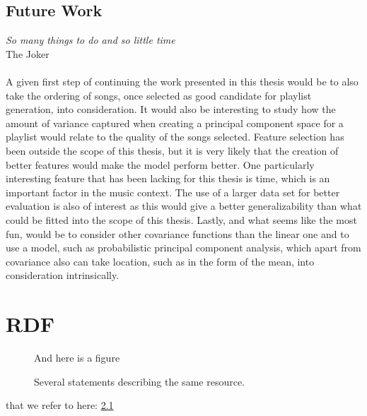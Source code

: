 \documentclass[a4paper,11pt]{kth-mag}
\begin{document}
\section{Future Work}
\textit{So many things to do and so little time} \\The Joker\\\\
A given first step of continuing the work presented in this thesis would be to also take the ordering of songs, once selected as good candidate for playlist generation, into consideration. It would also be interesting to study how the amount of variance captured when creating a principal component space for a playlist would relate to the quality of the songs selected. Feature selection has been outside the scope of this thesis, but it is very likely that the creation of better features would make the model perform better. One particularly interesting feature that has been lacking for this thesis is time, which is an important factor in the music context. The use of a larger data set for better evaluation is also of interest as this would give a better generalizability than what could be fitted into the scope of this thesis. Lastly, and what seems like the most fun, would be to consider other covariance functions than the linear one and to use a model, such as probabilistic principal component analysis, which apart from covariance also can take location, such as in the form of the mean, into consideration intrinsically.



\appendix
\addappheadtotoc
\chapter{RDF}\label{appA}

\begin{figure}[ht]
\begin{center}
And here is a figure
\caption{\small{Several statements describing the same resource.}}\label{RDF_4}
\end{center}
\end{figure}

that we refer to here: \ref{RDF_4}
\end{document}
